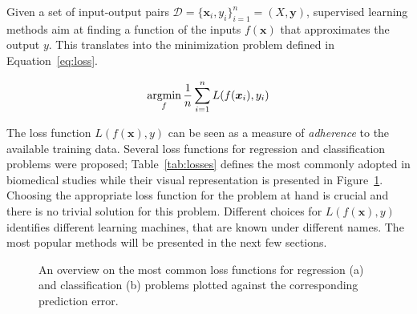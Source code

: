 	  Given a set of input-output pairs $\mathcal{D} = \{\bm{x}_i, y_i\}_{i=1}^n = (X, \bm{y})$, supervised learning methods aim at finding a function of the inputs $f(\bm{x})$ that approximates the output $y$. This translates into the minimization problem defined in Equation~\eqref{eq:loss}.

	  \begin{equation}\label{eq:loss}
	    \argmin_f \frac{1}{n}\sum_{i=1}^n L(f(\bm{x}_i),y_i) %
	  \end{equation}

	  The loss function $L(f(\bm{x}),y)$ can be seen as a measure of \textit{adherence} to the available training data. Several loss functions for regression and classification problems were proposed; Table~\ref{tab:losses} defines the most commonly adopted in biomedical studies while their visual representation is presented in Figure~\ref{fig:loss}.
	  Choosing the appropriate loss function for the problem at hand is crucial and there is no trivial solution for this problem.
	  Different choices for $L(f(\bm{x}),y)$ identifies different learning machines, that are known under different names. The most popular methods will be presented in the next few sections.

	  \begin{figure}[!h]
	  	\centering
	  	\caption{An overview on the most common loss functions for regression (a) and classification (b) problems plotted against the corresponding prediction error.}\label{fig:loss}
	  \end{figure}


